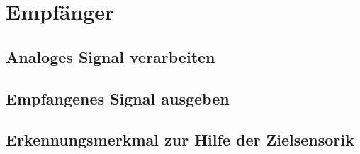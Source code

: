 \section{Empfänger}

\subsection{Analoges Signal verarbeiten}

\subsection{Empfangenes Signal ausgeben}

\subsection{Erkennungsmerkmal zur Hilfe der Zielsensorik}

